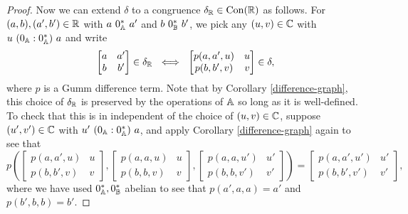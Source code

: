 \begin{appendices}
\begin{proof}
Now we can extend $\delta$ to a congruence $\delta_{\mathbb{R}} \in \operatorname{Con}(\mathbb{R})$ as follows. For $(a,b), (a',b') \in \mathbb{R}$ with $a\ 0_\bA^*\ a'$ and $b\ 0_{\mathbb{B}}^*\ b'$, we pick any $(u,v) \in \mathbb{C}$ with $u\ (0_{\mathbb{A}}:0_{\mathbb{A}}^*)\ a$ and write
\[
\begin{bmatrix} a & a'\\ b & b'\end{bmatrix} \in \delta_{\mathbb{R}}\ \iff\ \begin{bmatrix} p(a,a',u) & u\\ p(b,b',v) & v\end{bmatrix} \in \delta,
\]
where $p$ is a Gumm difference term. Note that by Corollary \ref{difference-graph}, this choice of $\delta_{\mathbb{R}}$ is preserved by the operations of $\mathbb{A}$ so long as it is well-defined. To check that this is in independent of the choice of $(u,v) \in \mathbb{C}$, suppose $(u',v') \in \mathbb{C}$ with $u'\ (0_{\mathbb{A}}:0_{\mathbb{A}}^*)\ a$, and apply Corollary \ref{difference-graph} again to see that
\[
p\left(\begin{bmatrix} p(a,a',u) & u\\ p(b,b',v) & v\end{bmatrix}, \begin{bmatrix} p(a,a,u) & u\\ p(b,b,v) & v\end{bmatrix}, \begin{bmatrix} p(a,a,u') & u'\\ p(b,b,v') & v'\end{bmatrix}\right) = \begin{bmatrix} p(a,a',u') & u'\\ p(b,b',v') & v'\end{bmatrix},
\]
where we have used $0_{\mathbb{A}}^*, 0_{\mathbb{B}}^*$ abelian to see that $p(a',a,a) = a'$ and $p(b',b,b) = b'$.


\end{proof}
\end{appendices}
